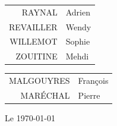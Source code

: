 \begin{titlepage}
\noindent
\begin{minipage}{0.45\linewidth}
\begin{center}\Large
\begin{tabular}{r@{ }l}
RAYNAL & Adrien \\ 
REVAILLER & Wendy \\ 
WILLEMOT & Sophie \\ 
ZOUITINE & Mehdi \\
\end{tabular}
\end{center}
\end{minipage}
\hfill
\begin{minipage}{0.45\linewidth}
\begin{center}\Large
\begin{tabular}{r@{ }l}
MALGOUYRES & François \\
MARÉCHAL & Pierre \\
\end{tabular}
\end{center}
\end{minipage}


\begin{flushright}\large
Le \today
\end{flushright}
\end{titlepage}
\restoregeometry